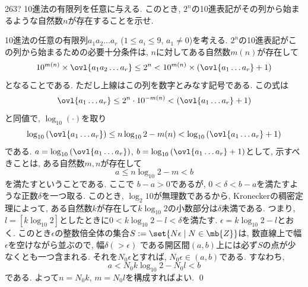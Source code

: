 \begin{prob}{263}{\hosi ?}{}
10進法の有限列を任意に与える. このとき, $2^n$の10進表記がその列から始まるような自然数$n$が存在することを示せ. 
\end{prob}

10進法の任意の有限列$a_1a_2\dots a_r$ ($1\leq a_i \leq 9$, $a_1\neq 0$)を考える. $2^n$の10進表記がこの列から始まるための必要十分条件は, $n$に対してある自然数$m(n)$が存在して
\[10^{m(n)}\times \ovl{a_1a_2\dots a_r} \leq 2^n < 10^{m(n)}\times (\ovl{a_1\dots a_r} + 1)\]
となることである. ただし上線はこの列を数字とみなす記号である. この式は
\[\ovl{a_1\dots a_r} \leq 2^n\cdot 10^{-m(n)} < (\ovl{a_1\dots a_r} + 1)\]
と同値で, $\log_{10}(\cdot )$を取り
\[\log_{10}{(\ovl{a_1\dots a_r})}  \leq n\log_{10}{2}-m(n)  < \log_{10}{(\ovl{a_1\dots a_r} + 1)}\]
である. $a= \log_{10}{(\ovl{a_1\dots a_r})}$, $b= \log_{10}{(\ovl{a_1\dots a_r} + 1)}$として, 示すべきことは, ある自然数$m,n$が存在して
\[a\leq n\log_{10}{2} - m < b\]
を満たすということである. ここで $b-a > 0$であるが, $0 < \delta < b-a$を満たすような正数$\delta$を一つ取る. このとき, $\log_{2}{10}$が無理数であるから, Kroneckerの稠密定理によって, ある自然数$k$が存在して$k\log_{10}{2}$の小数部分は$\delta$未満である. つまり, $l = [k\log_{10}{2}]$としたときに$0<k\log_{10}{2} - l< \delta$を満たす. $\epsilon = k\log_{10}{2} - l$とおく. このとき$\epsilon$の整数倍全体の集合$S:=\set{N\epsilon \mid N\in \mb{Z}}$は, 数直線上で幅$\epsilon$を空けながら並ぶので, 幅$\delta (> \epsilon)$ である開区間$(a,b)$上には必ず$S$の点が少なくとも一つ含まれる. それを$N_0\epsilon$とすれば, $N_0\epsilon \in (a,b)$である. すなわち, 
\[a < N_0k \log_{10}{2} - N_0l < b\]
である. よって$n=N_0k$, $m=N_0l$を構成すればよい. \qed 
